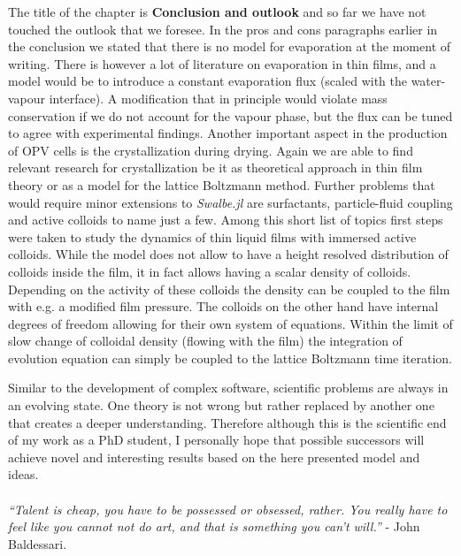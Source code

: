 The title of the chapter is \textbf{Conclusion and outlook} and so far we have not touched the outlook that we foresee.
In the pros and cons paragraphs earlier in the conclusion we stated that there is no model for evaporation at the moment of writing.
There is however a lot of literature on evaporation in thin films, and a model would be to introduce a constant evaporation flux (scaled with the water-vapour interface).
A modification that in principle would violate mass conservation if we do not account for the vapour phase, but the flux can be tuned to agree with experimental findings.
Another important aspect in the production of OPV cells is the crystallization during drying.
Again we are able to find relevant research for crystallization be it as theoretical approach in thin film theory or as a model for the lattice Boltzmann method.
Further problems that would require minor extensions to \textit{Swalbe.jl} are surfactants, particle-fluid coupling and active colloids to name just a few. 
Among this short list of topics first steps were taken to study the dynamics of thin liquid films with immersed active colloids.
While the model does not allow to have a height resolved distribution of colloids inside the film, it in fact allows having a scalar density of colloids.
Depending on the activity of these colloids the density can be coupled to the film with e.g. a modified film pressure.
The colloids on the other hand have internal degrees of freedom allowing for their own system of equations.
Within the limit of slow change of colloidal density (flowing with the film) the integration of evolution equation can simply be coupled to the lattice Boltzmann time iteration. 

Similar to the development of complex software, scientific problems are always in an evolving state.
One theory is not wrong but rather replaced by another one that creates a deeper understanding.
Therefore although this is the scientific end of my work as a PhD student, I personally hope that possible successors will achieve novel and interesting results based on the here presented model and ideas.\\
\\

\textit{``Talent is cheap, you have to be possessed or obsessed, rather. You really have to feel like you cannot not do art, and that is something you can’t will.''} - John Baldessari.

